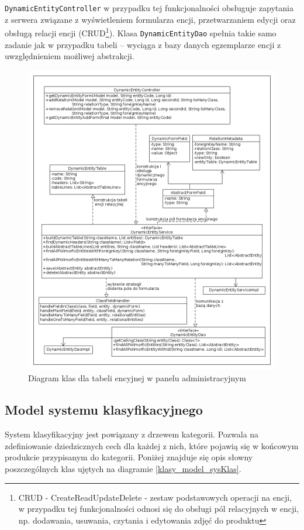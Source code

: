 \texttt{DynamicEntityController} w przypadku tej funkcjonalności obsługuje zapytania z serwera związane z wyświetleniem formularza encji, przetwarzaniem edycji oraz obsługą relacji encji (CRUD\footnote{CRUD - CreateReadUpdateDelete - zestaw podstawowych operacji na encji, w przypadku tej funkcjonalności odnosi się do obsługi pól relacyjnych w encji, np. dodawania, usuwania, czytania i edytowania zdjęć do produktu }). Klasa \texttt{DynamicEntityDao} spełnia takie samo zadanie jak w przypadku tabeli -- wyciąga z bazy danych egzemplarze encji z uwzględnieniem możliwej abstrakcji.
\begin{figure}
	\begin{center}
		\includegraphics[scale=0.4]{klasy_formularz_encyjny.png}
	\end{center}
	\caption{{\color{black}Diagram klas dla tabeli encyjnej w panelu administracyjnym}} \label{klasy_formularz_encyjny}
\end{figure}

\subsection{Model systemu klasyfikacyjnego}
System klasyfikacyjny jest powiązany z drzewem kategorii. Pozwala na zdefiniowanie dziedzicznych cech dla każdej z nich, które pojawią się w końcowym produkcie przypisanym do kategorii. Poniżej znajduje się opis słowny poszczególnych klas ujętych na diagramie \ref{klasy_model_sysKlas}.


